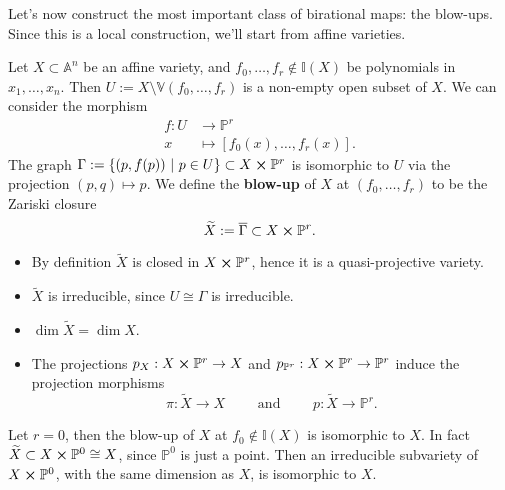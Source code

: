 Let's now construct the most important class of birational maps: the blow-ups.
Since this is a local construction, we'll start from affine varieties.
\begin{defn}
	Let $X \subset \mathbb{A}^{n}$ be an affine variety, and $f_0, \ldots, f_r \notin \mathbb{I}(X)$
	be polynomials in $x_1, \ldots, x_n$.
	Then $U := X \setminus \mathbb{V}\left( f_0, \ldots, f_r \right)$ is a non-empty open
	subset of $X$.
	We can consider the morphism
	\begin{align}
		f: U &\to \mathbb{P}^{r} \\
		x &\mapsto \left[ f_0(x) , \ldots , f_r(x) \right]
	.\end{align} 
	The graph $\Gamma := \left\{ \left(p, f(p)\right) \ \middle|\ p \in U \right\} \subset X \cross \mathbb{P}^{r}$
	is isomorphic to $U$ via the projection $\left(p, q\right) \mapsto p$.
	We define the \textbf{blow-up} of $X$ at $\left( f_0, \ldots, f_r \right)$ to be 
	the Zariski closure
	\begin{equation}
	\widetilde{X} := \overline{\Gamma} \subset X \cross \mathbb{P}^{r}
	.\end{equation} 
\end{defn}

\begin{rem}[]\leavevmode\vspace{-.2\baselineskip}
	\begin{itemize}
		\item By definition $\widetilde{X}$ is closed in $X \cross \mathbb{P}^{r}$, hence it
			is a quasi-projective variety.
		\item $\widetilde{X}$ is irreducible, since $U \cong \Gamma$ is irreducible.
		\item $\dim \widetilde{X} = \dim X$.
		\item The projections $p_X: X \cross \mathbb{P}^{r} \to X$ and
			$p_{\mathbb{P}^{r}}: X \cross \mathbb{P}^{r} \to \mathbb{P}^{r}$
			induce the projection morphisms
			\begin{equation}
			\pi: \widetilde{X} \to X \qquad \text{ and } \qquad
			p: \widetilde{X} \to \mathbb{P}^{r}
			.\end{equation} 
	\end{itemize}
\end{rem}

\begin{ex}
	Let $r = 0$, then the blow-up of $X$ at $f_0 \notin \mathbb{I}(X)$ is isomorphic to $X$.
	In fact $\widetilde{X} \subset X \cross \mathbb{P}^{0} \cong X$, since $\mathbb{P}^{0}$ is just a point.
	Then an irreducible subvariety of $X \cross \mathbb{P}^{0}$, with the same dimension as $X$,
	is isomorphic to $X$.	
\end{ex} 

